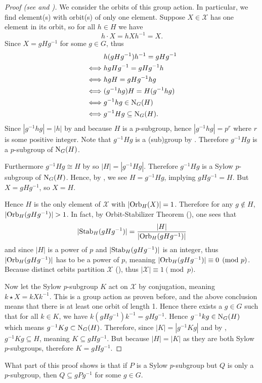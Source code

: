 \begin{proof}[Proof (see {\cite[Theorem 11.10]{humphreys_1996}} and {\cite[pp.~3--5]{mann_2011}})]
    We consider the orbits of this group action. In particular, we find element(s) with orbit(s) of only one element. Suppose $X \in \mathcal{X}$ has one element in its orbit, so for all $h \in H$ we have
    \[
        h\cdot X = hXh^{-1} = X.    
    \]
    Since $X = gHg^{-1}$ for some $g \in G$, thus
    \begin{align*}
        &h(gHg^{-1})h^{-1} = gHg^{-1}\\
        \iff&hgHg^{-1} = gHg^{-1}h\\
        \iff&hgH = gHg^{-1}hg\\
        \iff&(g^{-1}hg)H = H(g^{-1}hg)\\
        \iff&g^{-1}hg \in \mathrm{N}_{G}(H)\\
        \iff&g^{-1}Hg \subseteq \mathrm{N}_{G}(H).
    \end{align*}
    Since $|g^{-1}hg| = |h|$ by  and because $H$ is a $p$-subgroup, hence $|g^{-1}hg| = p^r$ where $r$ is some positive integer. Note that $g^{-1}Hg$ is a (sub)group by . Therefore $g^{-1}Hg$ is a $p$-subgroup of $\mathrm{N}_{G}(H)$.
    
    Furthermore $g^{-1}Hg \cong H$ by  so $|H| = |g^{-1}Hg|$. Therefore $g^{-1}Hg$ is a Sylow $p$-subgroup of $\mathrm{N}_{G}(H)$. Hence, by , we see $H = g^{-1}Hg$, implying $gHg^{-1} = H$. But $X = gHg^{-1}$, so $X = H$.
    
    Hence $H$ is the only element of $\mathcal{X}$ with $|\mathrm{Orb}_{H}(X)| = 1$. Therefore for any $g \notin H$, $|\mathrm{Orb}_{H}(gHg^{-1})| > 1$. In fact, by Orbit-Stabilizer Theorem (), one sees that
    \[
        |\mathrm{Stab}_{H}(gHg^{-1})| = \frac{|H|}{|\mathrm{Orb}_{H}(gHg^{-1})|}
    \]
    and since $|H|$ is a power of $p$ and $|\mathrm{Stab}_{H}(gHg^{-1})|$ is an integer, thus $|\mathrm{Orb}_{H}(gHg^{-1})|$ has to be a power of $p$, meaning $|\mathrm{Orb}_{H}(gHg^{-1})| \equiv 0 \pmod p$. Because distinct orbits partition $\mathcal{X}$ (), thus $|\mathcal{X}| \equiv 1 \pmod p$.

    Now let the Sylow $p$-subgroup $K$ act on $\mathcal{X}$ by conjugation, meaning $k \star X = kXk^{-1}$. This is a group action as proven before, and the above conclusion means that there is at least one orbit of length 1. Hence there exists a $g \in G$ such that for all $k \in K$, we have $k(gHg^{-1})k^{-1} = gHg^{-1}$. Hence $g^{-1}kg \in \mathrm{N}_{G}(H)$ which means $g^{-1}Kg \subset \mathrm{N}_{G}(H)$. Therefore, since $|K| = |g^{-1}Kg|$ and by , $g^{-1}Kg \subseteq H$, meaning $K \subseteq gHg^{-1}$. But because $|H| = |K|$ as they are both Sylow $p$-subgroups, therefore $K = gHg^{-1}$.
\end{proof}
\begin{remark}
    What part of this proof shows is that if $P$ is a Sylow $p$-subgroup but $Q$ is only a $p$-subgroup, then $Q \subseteq gPg^{-1}$ for some $g \in G$.
\end{remark}

